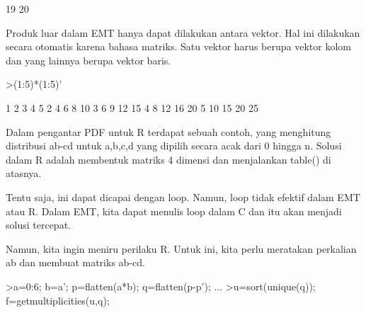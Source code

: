 \documentclass[a4paper,10pt]{article}
\begin{document}
\begin{eulernotebook}
\begin{eulercomment}
\begin{eulercomment}
\begin{eulercomment}
\begin{eulercomment}
\begin{eulercomment}
\begin{eulercomment}
\begin{eulercomment}
\begin{eulercomment}
\begin{eulercomment}
\begin{eulercomment}
\begin{eulercomment}
\begin{eulercomment}
\begin{eulercomment}
\begin{eulercomment}
\begin{eulercomment}
\begin{eulercomment}
\begin{eulercomment}
\begin{eulercomment}
\begin{eulercomment}
\begin{eulercomment}
\begin{eulercomment}
\begin{eulercomment}
\begin{eulercomment}
\begin{eulercomment}
\begin{eulercomment}
\begin{eulercomment}
\begin{eulercomment}
\begin{eulercomment}
\begin{eulercomment}
\begin{eulercomment}
\begin{eulercomment}
\begin{eulercomment}
\begin{eulercomment}
\begin{eulercomment}
\begin{eulercomment}
\begin{eulercomment}
\begin{eulercomment}
\begin{eulercomment}
\begin{eulercomment}
\begin{eulercomment}
\begin{eulercomment}
\begin{eulercomment}
\begin{eulercomment}
\begin{eulercomment}
\begin{eulercomment}
\begin{eulercomment}
\begin{eulercomment}
\begin{eulercomment}
\begin{eulercomment}
\begin{eulercomment}
\begin{eulercomment}
\begin{eulercomment}
\begin{eulercomment}
\begin{eulercomment}
\begin{eulercomment}
\begin{eulercomment}
\begin{eulercomment}
\begin{eulercomment}
\begin{eulercomment}
\begin{eulercomment}
\begin{eulercomment}
\begin{eulercomment}
\begin{eulercomment}
\begin{eulercomment}
\begin{eulercomment}
\begin{eulercomment}
\begin{eulercomment}
\begin{eulercomment}
\begin{euleroutput}
    19        20 
\end{euleroutput}
\begin{eulercomment}
Produk luar dalam EMT hanya dapat dilakukan antara vektor. Hal ini
dilakukan secara otomatis karena bahasa matriks. Satu vektor harus
berupa vektor kolom dan yang lainnya berupa vektor baris.
\end{eulercomment}
\begin{eulerprompt}
>(1:5)*(1:5)'
\end{eulerprompt}
\begin{euleroutput}
          1         2         3         4         5 
          2         4         6         8        10 
          3         6         9        12        15 
          4         8        12        16        20 
          5        10        15        20        25 
\end{euleroutput}
\begin{eulercomment}
Dalam pengantar PDF untuk R terdapat sebuah contoh, yang menghitung
distribusi ab-cd untuk a,b,c,d yang dipilih secara acak dari 0 hingga
n. Solusi dalam R adalah membentuk matriks 4 dimensi dan menjalankan
table() di atasnya.

Tentu saja, ini dapat dicapai dengan loop. Namun, loop tidak efektif
dalam EMT atau R. Dalam EMT, kita dapat menulis loop dalam C dan itu
akan menjadi solusi tercepat.

Namun, kita ingin meniru perilaku R. Untuk ini, kita perlu meratakan
perkalian ab dan membuat matriks ab-cd.
\end{eulercomment}
\begin{eulerprompt}
>a=0:6; b=a'; p=flatten(a*b); q=flatten(p-p'); ...
>u=sort(unique(q)); f=getmultiplicities(u,q); 
\end{eulerprompt}
\end{eulercomment}
\end{eulercomment}
\end{eulercomment}
\end{eulercomment}
\end{eulercomment}
\end{eulercomment}
\end{eulercomment}
\end{eulercomment}
\end{eulercomment}
\end{eulercomment}
\end{eulercomment}
\end{eulercomment}
\end{eulercomment}
\end{eulercomment}
\end{eulercomment}
\end{eulercomment}
\end{eulercomment}
\end{eulercomment}
\end{eulercomment}
\end{eulercomment}
\end{eulercomment}
\end{eulercomment}
\end{eulercomment}
\end{eulercomment}
\end{eulercomment}
\end{eulercomment}
\end{eulercomment}
\end{eulercomment}
\end{eulercomment}
\end{eulercomment}
\end{eulercomment}
\end{eulercomment}
\end{eulercomment}
\end{eulercomment}
\end{eulercomment}
\end{eulercomment}
\end{eulercomment}
\end{eulercomment}
\end{eulercomment}
\end{eulercomment}
\end{eulercomment}
\end{eulercomment}
\end{eulercomment}
\end{eulercomment}
\end{eulercomment}
\end{eulercomment}
\end{eulercomment}
\end{eulercomment}
\end{eulercomment}
\end{eulercomment}
\end{eulercomment}
\end{eulercomment}
\end{eulercomment}
\end{eulercomment}
\end{eulercomment}
\end{eulercomment}
\end{eulercomment}
\end{eulercomment}
\end{eulercomment}
\end{eulercomment}
\end{eulercomment}
\end{eulercomment}
\end{eulercomment}
\end{eulercomment}
\end{eulercomment}
\end{eulercomment}
\end{eulercomment}
\end{eulercomment}
\end{eulernotebook}
\end{document}

